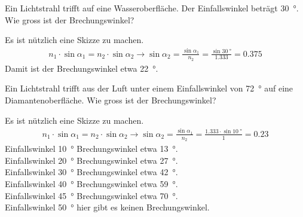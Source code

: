 \documentclass[12pt,a4paper,twoside]{article}
\begin{document}
\begin{aufgabe}
	Ein Lichtstrahl trifft auf eine Wasseroberfläche. Der Einfallswinkel beträgt \SI{30}{\degree}. Wie gross ist der Brechungswinkel?
	\begin{loesung}
		Es ist nützlich eine Skizze zu machen.
		\begin{eqnarray*}
			n_1\cdot\sin\alpha_1 = n_2\cdot\sin\alpha_2 \to \sin\alpha_2=\frac{\sin\alpha_1}{n_2}=\frac{\sin\SI{30}{\degree}}{\num{1.333}}=\num{0.375}
		\end{eqnarray*}
		Damit ist der Brechungswinkel etwa \SI{22}{\degree}.
	\end{loesung}
\end{aufgabe}

\begin{aufgabe}
	Ein Lichtstrahl trifft aus der Luft unter einem Einfallswinkel von \SI{72}{\degree} auf eine Diamantenoberfläche.
	Wie gross ist der Brechungswinkel?
\end{aufgabe}


\begin{loesung}
		Es ist nützlich eine Skizze zu machen.
		\begin{eqnarray*}
			n_1\cdot\sin\alpha_1 = n_2\cdot\sin\alpha_2 \to \sin\alpha_2=\frac{\sin\alpha_1}{n_2}=\frac{\num{1.333}\cdot\sin\SI{10}{\degree}}{1}=\num{0.23}
		\end{eqnarray*}
		Einfallswinkel \SI{10}{\degree} Brechungswinkel etwa \SI{13}{\degree}.\\
		Einfallswinkel \SI{20}{\degree} Brechungswinkel etwa \SI{27}{\degree}.\\
		Einfallswinkel \SI{30}{\degree} Brechungswinkel etwa \SI{42}{\degree}.\\
		Einfallswinkel \SI{40}{\degree} Brechungswinkel etwa \SI{59}{\degree}.\\
		Einfallswinkel \SI{45}{\degree} Brechungswinkel etwa \SI{70}{\degree}.\\
		Einfallswinkel \SI{50}{\degree} hier gibt es keinen Brechungswinkel.
\end{loesung}
\end{document}
